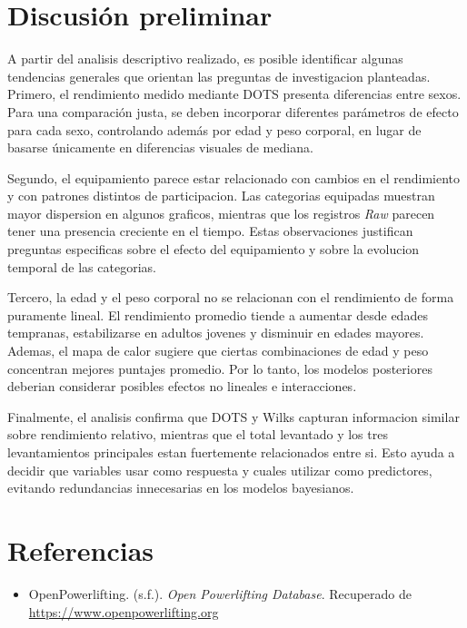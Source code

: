 \documentclass[
  spanish,
]{article}
\providecommand{\tightlist}{%
  \setlength{\itemsep}{0pt}\setlength{\parskip}{0pt}}
\begin{document}
\section{Discusión preliminar}\label{discusiuxf3n-preliminar}

A partir del analisis descriptivo realizado, es posible identificar
algunas tendencias generales que orientan las preguntas de investigacion
planteadas. Primero, el rendimiento medido mediante DOTS presenta
diferencias entre sexos. Para una comparación justa, se deben incorporar
diferentes parámetros de efecto para cada sexo, controlando además por
edad y peso corporal, en lugar de basarse únicamente en diferencias
visuales de mediana.

Segundo, el equipamiento parece estar relacionado con cambios en el
rendimiento y con patrones distintos de participacion. Las categorias
equipadas muestran mayor dispersion en algunos graficos, mientras que
los registros \emph{Raw} parecen tener una presencia creciente en el
tiempo. Estas observaciones justifican preguntas especificas sobre el
efecto del equipamiento y sobre la evolucion temporal de las categorias.

Tercero, la edad y el peso corporal no se relacionan con el rendimiento
de forma puramente lineal. El rendimiento promedio tiende a aumentar
desde edades tempranas, estabilizarse en adultos jovenes y disminuir en
edades mayores. Ademas, el mapa de calor sugiere que ciertas
combinaciones de edad y peso concentran mejores puntajes promedio. Por
lo tanto, los modelos posteriores deberian considerar posibles efectos
no lineales e interacciones.

Finalmente, el analisis confirma que DOTS y Wilks capturan informacion
similar sobre rendimiento relativo, mientras que el total levantado y
los tres levantamientos principales estan fuertemente relacionados entre
si. Esto ayuda a decidir que variables usar como respuesta y cuales
utilizar como predictores, evitando redundancias innecesarias en los
modelos bayesianos.

\section{Referencias}\label{referencias}

\begin{itemize}
\tightlist
\item
  OpenPowerlifting. (s.f.). \emph{Open Powerlifting Database}.
  Recuperado de \url{https://www.openpowerlifting.org}
\end{itemize}
\end{document}
